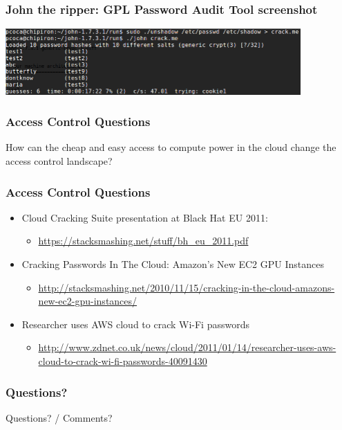 \documentclass{beamer}
\begin{document}


\begin{frame}
\frametitle{John the ripper: GPL Password Audit Tool screenshot}
\begin{center}
  \includegraphics[width=11.3cm]{figs/John_ScreenShot.png}
\end{center}
\end{frame}



\begin{frame}

\frametitle{Access Control Questions}
\begin{center}
\huge{How can the cheap and easy access to compute power in the cloud change the access control landscape?}
\end{center}
\end{frame}


\begin{frame}
\frametitle{Access Control Questions}
\begin{itemize}

\item Cloud Cracking Suite presentation at Black Hat EU 2011:
   \begin{itemize}
   \item \url{https://stacksmashing.net/stuff/bh_eu_2011.pdf}
   \end{itemize}

\item Cracking Passwords In The Cloud: Amazon’s New EC2 GPU Instances 
   \begin{itemize}
   \item \url{http://stacksmashing.net/2010/11/15/cracking-in-the-cloud-amazons-new-ec2-gpu-instances/}
   \end{itemize}

\item Researcher uses AWS cloud to crack Wi-Fi passwords 
   \begin{itemize}
   \item \url{http://www.zdnet.co.uk/news/cloud/2011/01/14/researcher-uses-aws-cloud-to-crack-wi-fi-passwords-40091430}
   \end{itemize}

\end{itemize}

\end{frame}


\begin{frame}
\frametitle{Questions?}
\begin{center}
\huge{Questions? / Comments?}
\end{center}
\end{frame}

\end{document}
